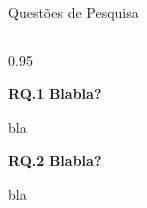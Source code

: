 \begin{frame}{Questões de Pesquisa}
    \vspace{0.4cm}
    
    \begin{columns}[T]
        \begin{column}{0.95\textwidth}
            
            \noindent
            \textbf{RQ.1} \textbf{Blabla?}
            
            \vspace{0.2cm}
            \hangindent=1.2cm  
            {\small bla}
            
            \vspace{0.6cm}
            
            \noindent
            \textbf{RQ.2} \textbf{Blabla?}
            
            \vspace{0.2cm}
            \hangindent=1.2cm  
            {\small bla}
            
        \end{column}
    \end{columns}

\end{frame}